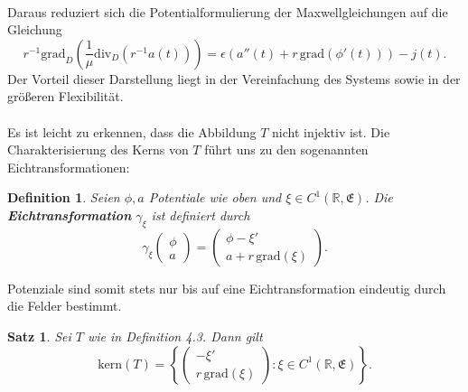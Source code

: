 \documentclass[11pt,a4paper,leqno]{report}
\newtheorem{proposition}{Satz}[chapter]
\newtheorem{definition}[theorem]{Definition}
\numberwithin{equation}{chapter}
\begin{document}
\\
Daraus reduziert sich die Potentialformulierung der Maxwellgleichungen auf die Gleichung  
\begin{equation} \label{eq:potential_ampere}
	r^{-1} \mathrm{grad}_D \left( \frac{1}{\mu} \mathrm{div}_D \left( r^{-1} a(t) \right) \right)
	= \epsilon \left( a''(t) + r\, \mathrm{grad}(\phi'(t)) \right) - j(t).
\end{equation}
Der Vorteil dieser Darstellung liegt in der Vereinfachung des Systems sowie in der größeren Flexibilität. \\ 
\\
Es ist leicht zu erkennen, dass die Abbildung \(T\) nicht injektiv ist. Die Charakterisierung des Kerns von \(T\) führt uns zu den sogenannten Eichtransformationen: 
\begin{definition}\label{def:eich}
	Seien \(\phi, a\) Potentiale wie oben und \(\xi \in C^1(\mathbb{R}, \mathfrak{E})\).  
	Die \textbf{Eichtransformation} \(\gamma_\xi\) ist definiert durch
	\begin{equation}
		\gamma_\xi \begin{pmatrix} \phi \\ a \end{pmatrix}
		= \begin{pmatrix} \phi - \xi' \\ a + r\, \mathrm{grad}(\xi) \end{pmatrix}.
	\end{equation}
\end{definition}
\noindent
Potenziale sind somit stets nur bis auf eine Eichtransformation eindeutig durch die Felder bestimmt.  
\begin{proposition}
	Sei \(T\) wie in Definition 4.3. Dann gilt
	\[
	\mathrm{kern}(T) = \left\{ \begin{pmatrix} -\xi' \\ r\, \mathrm{grad}(\xi) \end{pmatrix} : \xi \in C^1(\mathbb{R}, \mathfrak{E}) \right\}.
	\]
\end{proposition}
\noindent
\end{document}
